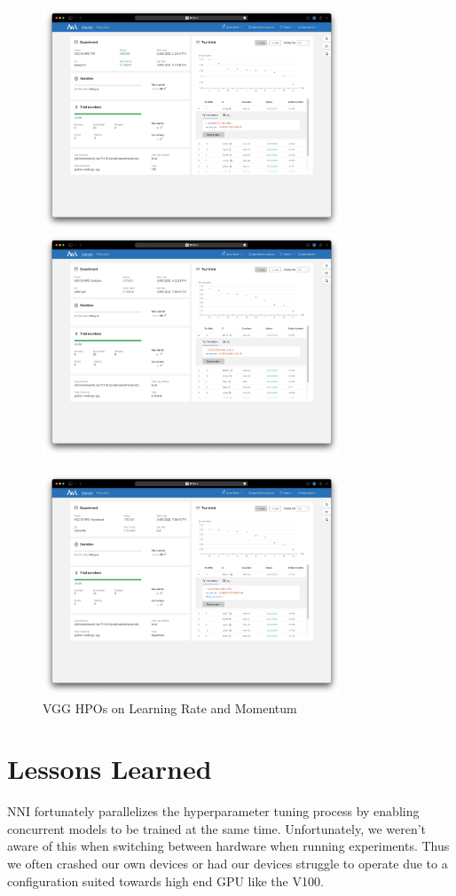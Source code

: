 \documentclass{article}
\begin{document}
\begin{figure}
    \centerline{\includegraphics[width=3.5in]{../proj3/figures/vgg_tpe_overview.png}\includegraphics[width=3.5in]{../proj3/figures/vgg_evolution_overview.png}}
    \centerline{\includegraphics[width=3.5in]{../proj3/figures/vgg_hyperband_overview.png}}
    \caption{VGG HPOs on Learning Rate and Momentum}
    \label{fig:vgg-all}
\end{figure}

\section{Lessons Learned}
NNI fortunately parallelizes the hyperparameter tuning process by enabling concurrent models to be trained at the same time. Unfortunately, we weren't aware of this when switching between hardware when running experiments. Thus we often crashed our own devices or had our devices struggle to operate due to a configuration suited towards high end GPU like the V100. 
\end{document}
